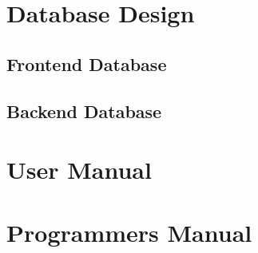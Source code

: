 \documentclass[11pt,letterpaper]{article}
\begin{document}
\section{Database Design}
\subsection{Frontend Database}
\subsection{Backend Database}

\section{User Manual}

\section{Programmers Manual}
\end{document}
